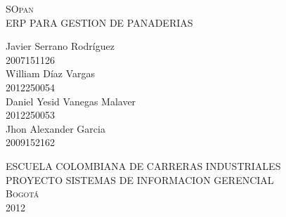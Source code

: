 \begin{titlepage}
\setlength{\parindent}{0pt} \setlength{\parskip}{0pt}

\begin{center}

\textsc{\large SOpan}\\[0.2cm]
{\large ERP PARA GESTION DE PANADERIAS}\\[1cm]
\end{center}

\begin{center}

\end{center}

\begin{center}

\vfill
{\Large Javier Serrano Rodr\'iguez\\2007151126\\William D\'iaz Vargas\\2012250054\\Daniel Yesid Vanegas Malaver\\2012250053\\Jhon Alexander Garcia\\2009152162\\[0.4cm]}
\end{center}
\vfill
\begin{center}
\large \textsc{ESCUELA COLOMBIANA DE CARRERAS INDUSTRIALES\\PROYECTO SISTEMAS DE INFORMACION GERENCIAL\\Bogot\'a\\2012}
\end{center}
\end{titlepage}